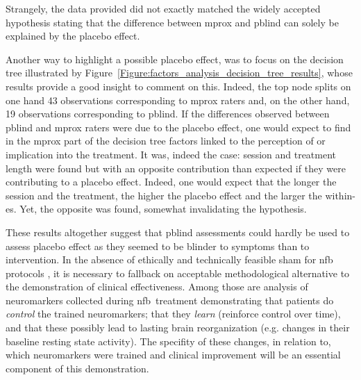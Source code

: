 Strangely, the data provided did not exactly matched the widely accepted hypothesis stating that the difference between
\gls{mprox} and \gls{pblind} can solely be explained by the placebo effect. 

Another way to highlight a possible placebo effect, was to focus on the decision tree illustrated by 
Figure~\ref{Figure:factors_analysis_decision_tree_results}, whose results provide a good insight to comment on this.
Indeed, the top node splits on one hand 43 observations corresponding to \gls{mprox} raters and, on the other hand, 
19 observations corresponding to \gls{pblind}. If the differences observed between \gls{pblind} and \gls{mprox} raters were 
due to the placebo effect, one would expect to find in the \gls{mprox} part of the decision tree factors linked to the perception
of or implication into the treatment. It was, indeed the case: session and treatment length were found but with an
opposite contribution than expected if they were contributing to a placebo effect.  Indeed, one would expect that the
longer the session and the treatment, the higher the placebo effect and the larger the within-\gls{es}. Yet, the opposite was found, 
somewhat invalidating the hypothesis. 

These results altogether suggest that \gls{pblind} assessments could hardly be used to assess placebo effect as they seemed to be blinder 
to symptoms than to intervention. In the absence of ethically \citep{Holtmann2014} and technically \citep{Birbaumer1991} feasible sham 
for \gls{nfb} protocols \citep{World-Medical-Association2000}, it is necessary to fallback on acceptable methodological alternative to 
the demonstration of clinical effectiveness. Among those are analysis of neuromarkers collected during \gls{nfb} treatment demonstrating 
that patients do \emph{control} the trained neuromarkers; that they \emph{learn} (reinforce control over time), and that these possibly 
lead to lasting brain reorganization (e.g. changes in their baseline resting state activity). The specifity of these changes, in relation 
to, which neuromarkers were trained and clinical improvement will be an essential component of this demonstration.  



